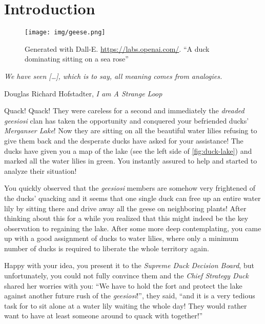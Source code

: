 \chapter{Introduction}\label{ch:introduction}

\vspace*{-50pt}

\begin{figure}[ht]
        \texttt{[image: img/geese.png]}
        \captionsetup{textformat=empty,labelformat=blank}
        \caption{Generated with Dall-E. \url{https://labs.openai.com/}. ``A duck dominating sitting on a sea rose''}
\end{figure}

\epigraph{\itshape We have seen [\ldots], which is to say, all meaning comes from analogies.}{Douglas Richard Hofstadter, \textit{I am A Strange Loop}}

Quack! Quack! They were careless for a second and immediately the \textit{dreaded geesiosi} clan has taken the opportunity and conquered your befriended ducks' \textit{Merganser Lake}!
Now they are sitting on all the beautiful water lilies refusing to give them back and the desperate ducks have asked for your assistance!
The ducks have given you a map of the lake (see the left side of \cref{fig:duck-lake}) and marked all the water lilies in green.
You instantly assured to help and started to analyze their situation!

You quickly observed that the \textit{geesiosi} members are somehow very frightened of the ducks' quacking and it seems that one single duck can free up an entire water lily by sitting there and drive away all the geese on neighboring plants! 
After thinking about this for a while you realized that this might indeed be the key observation to regaining the lake. 
After some more deep contemplating, you came up with a good assignment of ducks to water lilies, where only a minimum number of ducks is required to liberate the whole territory again.

Happy with your idea, you present it to the \textit{Supreme Duck Decision Board}, but unfortunately, you could not fully convince them and the \textit{Chief Strategy Duck} shared her worries with you: 
``We have to hold the fort and protect the lake against another future rush of the \textit{geesiosi}!'', they said, ``and it is a very tedious task for to sit alone at a water lily waiting the whole day! They would rather want to have at least someone around to quack with together!''

